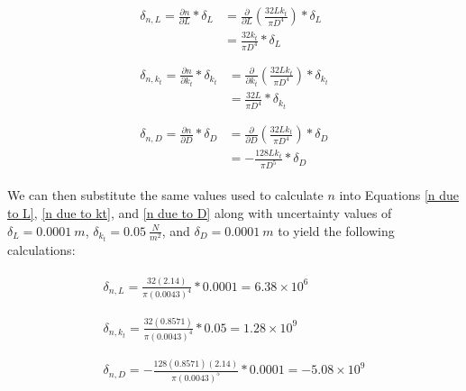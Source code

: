 \documentclass[12pt]{article}
\begin{document}
\begin{align}
    \begin{split}
        \delta_{n,L}=\frac{\partial n}{\partial L}*\delta_L&=\frac{\partial}{\partial L}(\frac{32 L k_t}{\pi D^4})*\delta_L \\
        &=\frac{32k_t}{\pi D^4}*\delta_L \label{n due to L}
    \end{split} \\ \nonumber \\
    \begin{split}
        \delta_{n,k_t}=\frac{\partial n}{\partial k_t}*\delta_{k_t}&=\frac{\partial}{\partial k_t}(\frac{32 L k_t}{\pi D^4})*\delta_{k_t} \\
        &=\frac{32L}{\pi D^4}*\delta_{k_t} \label{n due to kt}
    \end{split} \\ \nonumber \\
    \begin{split}
        \delta_{n,D}=\frac{\partial n}{\partial D}*\delta_D&=\frac{\partial}{\partial D}(\frac{32 L k_t}{\pi D^4})*\delta_D \\
        &=-\frac{128 L k_t}{\pi D^5}*\delta_D \label{n due to D}
    \end{split}
\end{align}

We can then substitute the same values used to calculate $n$ into Equations \ref{n due to L}, \ref{n due to kt}, and \ref{n due to D} along with uncertainty values of $\delta_L=0.0001\ m$, $\delta_{k_t}=0.05\ \frac{N}{m^2}$, and $\delta_D=0.0001\ m$ to yield the following calculations:

\begin{align*}
    \begin{split}
        \delta_{n,L}=\frac{32(2.14)}{\pi(0.0043)^4}*0.0001=6.38\times10^6
    \end{split} \\ \\
    \begin{split}
        \delta_{n,k_t}=\frac{32(0.8571)}{\pi(0.0043)^4}*0.05=1.28\times10^9
    \end{split} \\ \\
    \begin{split}
        \delta_{n,D}=-\frac{128(0.8571)(2.14)}{\pi(0.0043)^5}*0.0001=-5.08\times10^{9}
    \end{split}
\end{align*}
\end{document}

